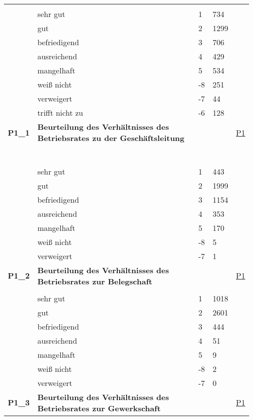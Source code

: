 \begin{longtable}{| L{2.5cm} | L{8.25cm}| C{1.5cm} | R{1.25cm} | C{2.25cm} |  }
   &  &  &  &  \\ 
   & sehr gut & 1 & 734 &  \\ 
   & gut & 2 & 1299 &  \\ 
   & befriedigend & 3 & 706 &  \\ 
   & ausreichend & 4 & 429 &  \\ 
   & mangelhaft & 5 & 534 &  \\ 
   & weiß nicht & -8 & 251 &  \\ 
   & verweigert & -7 & 44 &  \\ 
   & trifft nicht zu & -6 & 128 &  \\ 
   \midrule
\textbf{P1\_1}\label{var:suf:P1:1} & \textbf{Beurteilung des Verhältnisses des Betriebsrates zu der Geschäftsleitung} &  &  & \hyperref[P1]{P1} \\ 
   & \protect\subsection[Variablen P1\_1 bis branche10]{} &  &  &  \\ 
   & sehr gut & 1 & 443 &  \\ 
   & gut & 2 & 1999 &  \\ 
   & befriedigend & 3 & 1154 &  \\ 
   & ausreichend & 4 & 353 &  \\ 
   & mangelhaft & 5 & 170 &  \\ 
   & weiß nicht & -8 & 5 &  \\ 
   & verweigert & -7 & 1 &  \\ 
   \midrule
\textbf{P1\_2}\label{var:suf:P1:2} & \textbf{Beurteilung des Verhältnisses des Betriebsrates zur Belegschaft} &  &  & \hyperref[P1]{P1} \\ 
   &  &  &  &  \\ 
   & sehr gut & 1 & 1018 &  \\ 
   & gut & 2 & 2601 &  \\ 
   & befriedigend & 3 & 444 &  \\ 
   & ausreichend & 4 & 51 &  \\ 
   & mangelhaft & 5 & 9 &  \\ 
   & weiß nicht & -8 & 2 &  \\ 
   & verweigert & -7 & 0 &  \\ 
   \midrule
\textbf{P1\_3}\label{var:suf:P1:3} & \textbf{Beurteilung des Verhältnisses des Betriebsrates zur Gewerkschaft} &  &  & \hyperref[P1]{P1} \\ 

\end{longtable}
